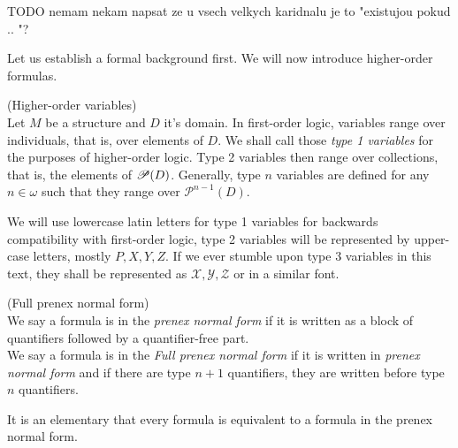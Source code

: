 TODO nemam nekam napsat ze u vsech velkych karidnalu je to "existujou pokud .. "?

Let us establish a formal background first. We will now introduce higher-order formulas.

\begin{definition}{(Higher-order variables)}\label{def:higher_order_variables}\\
Let $M$ be a structure and $D$ it's domain. In first-order logic, variables range over individuals, that is, over elements of $D$. We shall call those \emph{type 1 variables} for the purposes of higher-order logic. Type 2 variables then range over collections, that is, the elements of $\mathscr{P} (D)$. Generally, type $n$ variables are defined for any $n \in \omega$ such that they range over $\mathscr{P}^{n-1}(D)$.
\end{definition}
We will use lowercase latin letters for type 1 variables for backwards compatibility with first-order logic, type 2 variables will be represented by upper-case letters, mostly $P, X, Y, Z$. If we ever stumble upon type 3 variables in this text, they shall be represented as $\mathscr{X}, \mathscr{Y}, \mathscr{Z}$ or in a similar font.

\begin{definition}{(Full prenex normal form)}\label{def:pnf}\\
We say a formula is in the \emph{prenex normal form} if it is written as a block of quantifiers followed by a quantifier-free part.\\
We say a formula is in the \emph{Full prenex normal form} if it is written in \emph{prenex normal form} and if there are type $n+1$ quantifiers, they are written before type $n$ quantifiers.
\end{definition}
It is an elementary that every formula is equivalent to a formula in the prenex normal form.


